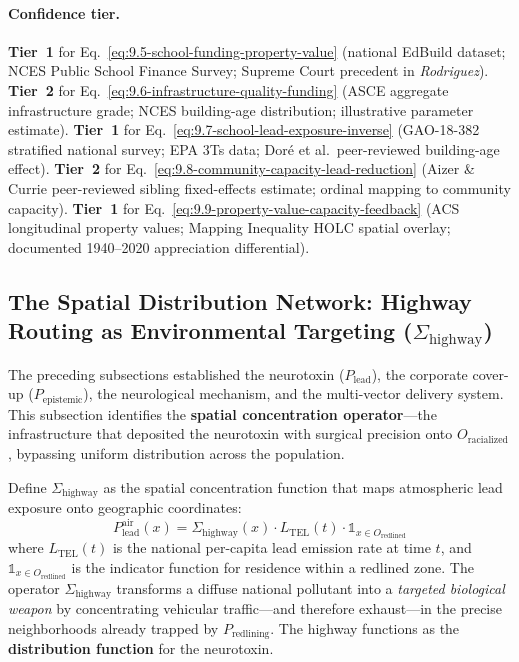 \paragraph{Confidence tier.}
\textbf{Tier~1} for Eq.~\ref{eq:9.5-school-funding-property-value} (national EdBuild dataset; NCES Public School Finance Survey; Supreme Court precedent in \textit{Rodriguez}). \textbf{Tier~2} for Eq.~\ref{eq:9.6-infrastructure-quality-funding} (ASCE aggregate infrastructure grade; NCES building-age distribution; illustrative parameter estimate). \textbf{Tier~1} for Eq.~\ref{eq:9.7-school-lead-exposure-inverse} (GAO-18-382 stratified national survey; EPA 3Ts data; Dor\'{e} et al.\ peer-reviewed building-age effect). \textbf{Tier~2} for Eq.~\ref{eq:9.8-community-capacity-lead-reduction} (Aizer \& Currie peer-reviewed sibling fixed-effects estimate; ordinal mapping to community capacity). \textbf{Tier~1} for Eq.~\ref{eq:9.9-property-value-capacity-feedback} (ACS longitudinal property values; Mapping Inequality HOLC spatial overlay; documented 1940--2020 appreciation differential).

\FloatBarrier

\subsection{The Spatial Distribution Network: Highway Routing as Environmental Targeting (\texorpdfstring{$\Sigma_{\text{highway}}$}{Sigma\_highway})}

The preceding subsections established the neurotoxin ($P_{\text{lead}}$), the corporate cover-up ($P_{\text{epistemic}}$), the neurological mechanism, and the multi-vector delivery system. This subsection identifies the \textbf{spatial concentration operator}---the infrastructure that deposited the neurotoxin with surgical precision onto $O_{\text{racialized}}$, bypassing uniform distribution across the population.

Define $\Sigma_{\text{highway}}$ as the spatial concentration function that maps atmospheric lead exposure onto geographic coordinates:
\begin{equation}\label{eq:9.10-highway-lead-spatial-concentration}
P_{\text{lead}}^{\text{air}}(x) = \Sigma_{\text{highway}}(x) \cdot L_{\text{TEL}}(t) \cdot \mathbb{1}_{x \in O_{\text{redlined}}}
\end{equation}
where $L_{\text{TEL}}(t)$ is the national per-capita lead emission rate at time $t$, and $\mathbb{1}_{x \in O_{\text{redlined}}}$ is the indicator function for residence within a redlined zone. The operator $\Sigma_{\text{highway}}$ transforms a diffuse national pollutant into a \textit{targeted biological weapon} by concentrating vehicular traffic---and therefore exhaust---in the precise neighborhoods already trapped by $P_{\text{redlining}}$. The highway functions as the \textbf{distribution function} for the neurotoxin.

